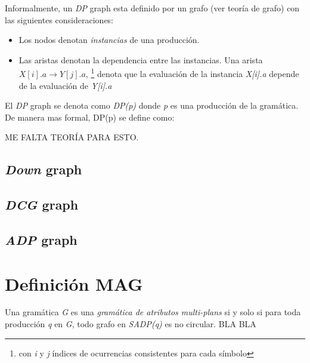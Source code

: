 Informalmente, un \textit{DP} graph esta definido por un grafo (ver teoría de grafo) con las siguientes consideraciones: 

\begin{itemize}
\item Los nodos denotan \textit{instancias} de una producción.
\item Las aristas denotan la dependencia entre las instancias. Una arista $X[i].a\rightarrow Y[j].a$, \footnote{con \textit{i} y \textit{j} índices de ocurrencias consistentes para cada símbolo} denota que la evaluación de la instancia \textit{X[i].a} depende de la evaluación de \textit{Y[i].a} 
\end{itemize}

El \textit{DP} graph se denota como \textit{DP(p)} donde \textit{p} es una producción de la gramática. De manera mas formal, DP(p) se define como:

ME FALTA TEORÍA PARA ESTO.


\subsection{\textit{Down} graph}

\subsection{\textit{DCG} graph}

\subsection{\textit{ADP} graph}



\section{Definición MAG}

Una gramática \textit{G} es una \textit{gramática de atributos multi-plans} si y solo si para toda producción \textit{q} en \textit{G}, todo grafo en \textit{SADP(q)} es no circular.
BLA BLA   
